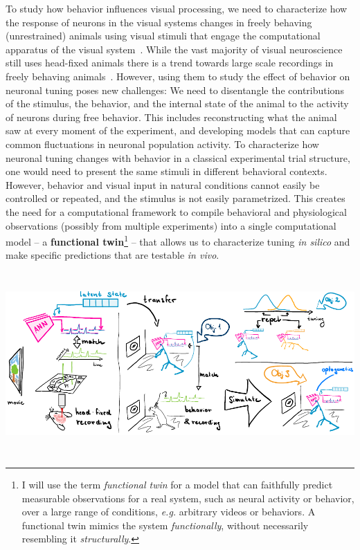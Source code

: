 \documentclass[COG,11pt]{ercgrant}
\begin{document}
To study how behavior influences visual processing, we need to characterize how the response of neurons in the visual systems changes in freely behaving (unrestrained) animals using visual stimuli that engage the computational apparatus of the visual system~\parencite{Huk2018-ez, Datta2019-qj}. 
While the vast majority of visual neuroscience still uses head-fixed animals there is a trend towards large scale recordings in freely behaving animals~\parencite{Parker2022-ac}.
However, using them to study the effect of behavior on neuronal tuning poses new challenges:
 We need to disentangle the contributions of the stimulus, the behavior, and the internal state of the animal to the activity of neurons during free behavior. 
This includes reconstructing what the animal saw at every moment of the experiment, and developing models that can capture common fluctuations in neuronal population activity.
 To characterize how neuronal tuning changes with behavior in a classical experimental trial structure, one would need to present the same stimuli in different behavioral contexts. 
However, behavior and visual input in natural conditions cannot easily be controlled or repeated, and the stimulus is not easily parametrized.
This creates the need for a computational framework to compile behavioral and physiological observations (possibly from multiple experiments) into a single computational model -- a \textbf{functional twin}\footnote{I will use the term \textit{functional twin} for a model that can faithfully predict measurable observations for a real system, such as neural activity or behavior, over a large range of conditions, \textit{e.g.} arbitrary videos or behaviors. A functional twin mimics the system \textit{functionally}, without necessarily resembling it \textit{structurally}. } -- that allows us to characterize tuning \textit{in silico} and make specific predictions that are testable \textit{in vivo}.

\includegraphics[width=\textwidth, height=7cm]{figures/overview.pdf}
\end{document}
